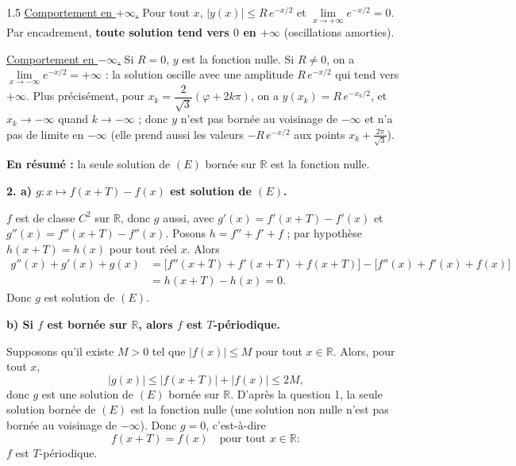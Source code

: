 \documentclass[12pt]{article}
\begin{document}
\begin{spacing}{1.5}
\underline{Comportement en $+\infty$.} Pour tout $x$, $|y(x)|\le R\,e^{-x/2}$ et $\lim\limits_{x\to+\infty}e^{-x/2}=0$. Par encadrement, \textbf{toute solution tend vers $0$ en $+\infty$} (oscillations amorties).

\underline{Comportement en $-\infty$.} Si $R=0$, $y$ est la fonction nulle. Si $R\neq 0$, on a $\lim\limits_{x\to-\infty}e^{-x/2}=+\infty$ : la solution oscille avec une amplitude $R\,e^{-x/2}$ qui tend vers $+\infty$. Plus précisément, pour $x_k=\dfrac{2}{\sqrt3}(\varphi+2k\pi)$, on a $y(x_k)=R\,e^{-x_k/2}$, et $x_k\to-\infty$ quand $k\to-\infty$ ; donc $y$ n'est pas bornée au voisinage de $-\infty$ et n'a pas de limite en $-\infty$ (elle prend aussi les valeurs $-R\,e^{-x/2}$ aux points $x_k+\frac{2\pi}{\sqrt3}$).

\textbf{En résumé :} la seule solution de $(E)$ bornée sur $\mathbb{R}$ est la fonction nulle.

\textbf{2. a) $g:x\mapsto f(x+T)-f(x)$ est solution de $(E)$.}

$f$ est de classe $C^2$ sur $\mathbb{R}$, donc $g$ aussi, avec $g'(x)=f'(x+T)-f'(x)$ et $g''(x)=f''(x+T)-f''(x)$. Posons $h=f''+f'+f$ ; par hypothèse $h(x+T)=h(x)$ pour tout réel $x$. Alors
\begin{align*}
g''(x)+g'(x)+g(x)&=\big[f''(x+T)+f'(x+T)+f(x+T)\big]-\big[f''(x)+f'(x)+f(x)\big]\\
&=h(x+T)-h(x)=0 .
\end{align*}
Donc $g$ est solution de $(E)$.

\textbf{b) Si $f$ est bornée sur $\mathbb{R}$, alors $f$ est $T$-périodique.}

Supposons qu'il existe $M>0$ tel que $|f(x)|\le M$ pour tout $x\in\mathbb{R}$. Alors, pour tout $x$,
\[
|g(x)|\le|f(x+T)|+|f(x)|\le 2M ,
\]
donc $g$ est une solution de $(E)$ bornée sur $\mathbb{R}$. D'après la question 1, la seule solution bornée de $(E)$ est la fonction nulle (une solution non nulle n'est pas bornée au voisinage de $-\infty$). Donc $g=0$, c'est-à-dire
\[
f(x+T)=f(x)\quad\text{pour tout } x\in\mathbb{R}:
\]
$f$ est $T$-périodique.


\end{spacing}
\end{document}
